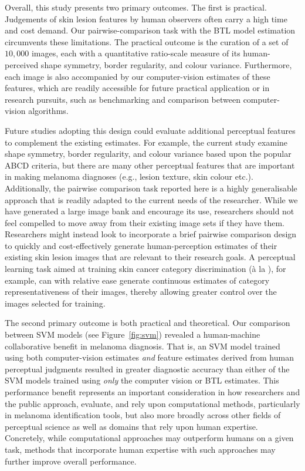 \documentclass[
    man, 12pt, a4paper,
    donotrepeattitle, floatsintext, draftfirst
]{apa7}
\begin{document}
Overall, this study presents two primary outcomes. The first is practical. Judgements of skin lesion features by human observers often carry a high time and cost demand. Our pairwise-comparison task with the BTL model estimation circumvents these limitations. The practical outcome is the curation of a set of $10,000$ images, each with a quantitative ratio-scale measure of its human-perceived shape symmetry, border regularity, and colour variance. Furthermore, each image is also accompanied by our computer-vision estimates of these features, which are readily accessible for future practical application or in research pursuits, such as benchmarking and comparison between computer-vision algorithms.

Future studies adopting this design could evaluate additional perceptual features to complement the existing estimates. For example, the current study examine shape symmetry, border regularity, and colour variance based upon the popular ABCD criteria, but there are many other perceptual features that are important in making melanoma diagnoses (e.g., lesion texture, skin colour etc.). Additionally, the pairwise comparison task reported here is a highly generalisable approach that is readily adapted to the current needs of the researcher. While we have generated a large image bank and encourage its use, researchers should not feel compelled to move away from their existing image sets if they have them. Researchers might instead look to incorporate a brief pairwise comparison design to quickly and cost-effectively generate human-perception estimates of their existing skin lesion images that are relevant to their research goals. A perceptual learning task aimed at training skin cancer category discrimination (\`a la \cite{kellman2023connecting}), for example, can with relative ease generate continuous estimates of category representativeness of their images, thereby allowing greater control over the images selected for training.

The second primary outcome is both practical and theoretical. Our comparison between SVM models (see Figure~\ref{fig:svm}) revealed a human-machine collaborative benefit in melanoma diagnosis. That is, an SVM model trained using both computer-vision estimates \textit{and} feature estimates derived from human perceptual judgments resulted in greater diagnostic accuracy than either of the SVM models trained using \textit{only} the computer vision or BTL estimates. This performance benefit represents an important consideration in how researchers and the public approach, evaluate, and rely upon computational methods, particularly in melanoma identification tools, but also more broadly across other fields of perceptual science as well as domains that rely upon human expertise. Concretely, while computational approaches may outperform humans on a given task, methods that incorporate human expertise with such approaches may further improve overall performance.
\end{document}
